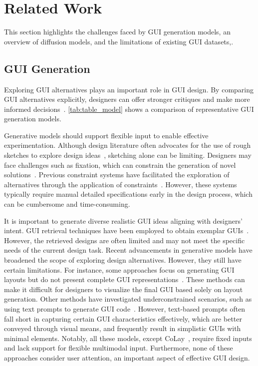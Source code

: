 \section{Related Work}
This section highlights the challenges faced by GUI generation models, an overview of diffusion models, and the limitations of existing GUI datasets,.



\subsection{GUI Generation}

Exploring GUI alternatives plays an important role in GUI design.   By comparing GUI alternatives explicitly, designers can offer stronger critiques and make more informed decisions~\cite{dow2011prototyping, tohidi2006getting, jiang2022computational, jiang2024computational2, jiang2023future, jiang2024computational}. \autoref{tab:table_model} shows a comparison of representative GUI generation models. 


Generative models should support flexible input to enable effective experimentation. Although design literature often advocates for the use of rough sketches to explore design ideas~\cite{boyarski1994computers, landay1996silk}, sketching alone can be limiting. Designers may face challenges such as fixation, which can constrain the generation of novel solutions~\cite{jansson1991design}. Previous constraint systems have facilitated the exploration of alternatives through the application of constraints~\cite{swearngin2020scout, jiang2019orclayout, jiang2020orcsolver, jiang2020reverseorc, jiang2024flexdoc}. However, these systems typically require manual detailed specifications early in the design process, which can be cumbersome and time-consuming.


It is important to generate diverse realistic GUI ideas aligning with designers' intent. 
GUI retrieval techniques have been employed to obtain exemplar GUIs~\cite{herring2009getting, kumar2013webzeitgeist, li2021screen2vec}. However, the retrieved designs are often limited and may not meet the specific needs of the current design task. Recent advancements in generative models have broadened the scope of exploring design alternatives. However, they still have certain limitations. For instance, some approaches focus on generating GUI layouts but do not present complete GUI representations~\cite{cheng2023play, cheng2024colay}. These methods can make it difficult for designers to visualize the final GUI based solely on layout generation. Other methods have investigated underconstrained scenarios, such as using text prompts to generate GUI code~\cite{wu2024uicoder}. However, text-based prompts often fall short in capturing certain GUI characteristics effectively, which are better conveyed through visual means, and frequently result in simplistic GUIs with minimal elements. Notably, all these models, except CoLay~\cite{cheng2024colay}, require fixed inputs and lack support for flexible multimodal input. Furthermore, none of these approaches consider user attention, an important aspect of effective GUI design.

